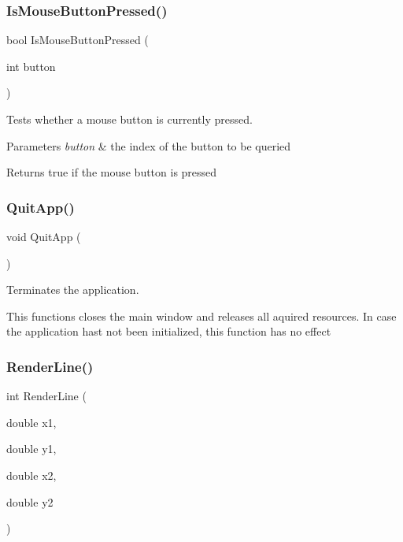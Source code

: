 \subsubsection{\texorpdfstring{Is\+Mouse\+Button\+Pressed()}{IsMouseButtonPressed()}}
{\footnotesize\ttfamily bool Is\+Mouse\+Button\+Pressed (\begin{DoxyParamCaption}\item[{int}]{button }\end{DoxyParamCaption})}

Tests whether a mouse button is currently pressed.


\begin{DoxyParams}{Parameters}
{\em button} & the index of the button to be queried \\
\hline
\end{DoxyParams}
\begin{DoxyReturn}{Returns}
{\ttfamily true} if the mouse button is pressed 
\end{DoxyReturn}
\mbox{\label{group__sdl__group_gaf4cba1685a7c46bccc7bbdf863114cee}} 
\subsubsection{\texorpdfstring{Quit\+App()}{QuitApp()}}
{\footnotesize\ttfamily void Quit\+App (\begin{DoxyParamCaption}{ }\end{DoxyParamCaption})}

Terminates the application.

This functions closes the main window and releases all aquired resources. In case the application hast not been initialized, this function has no effect \mbox{\label{group__sdl__group_gade420aec0a7492d5ac5f320b1ff4a814}} 
\subsubsection{\texorpdfstring{Render\+Line()}{RenderLine()}}
{\footnotesize\ttfamily int Render\+Line (\begin{DoxyParamCaption}\item[{double}]{x1,  }\item[{double}]{y1,  }\item[{double}]{x2,  }\item[{double}]{y2 }\end{DoxyParamCaption})}

